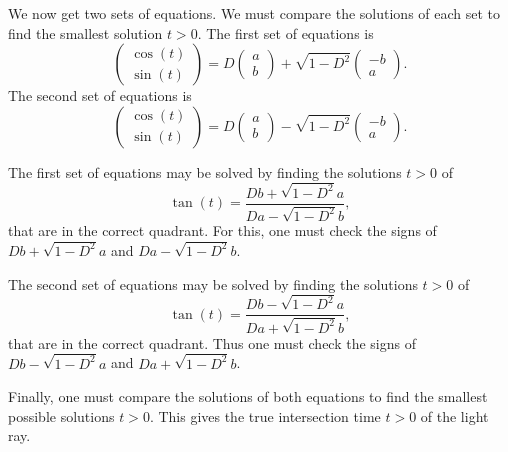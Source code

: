 \documentclass{article}
\begin{document}
We now get two sets of equations. We must compare the solutions of each set to find the smallest solution \(t>0\). The first set of equations is
\[\begin{pmatrix} \cos(t) \\ \sin(t)\end{pmatrix} = D \begin{pmatrix} a \\ b \end{pmatrix} + \sqrt{1-D^2}\begin{pmatrix} -b \\ a \end{pmatrix}.\]
The second set of equations is
\[\begin{pmatrix} \cos(t) \\ \sin(t)\end{pmatrix} = D \begin{pmatrix} a \\ b \end{pmatrix} - \sqrt{1-D^2}\begin{pmatrix} -b \\ a \end{pmatrix}.\]

The first set of equations may be solved by finding the solutions \(t>0\) of 
\[\tan(t) = \frac{D b + \sqrt{1-D^2} a}{D a - \sqrt{1-D^2} b}, \]
that are in the correct quadrant. For this, one must check the signs of \( D b + \sqrt{1-D^2} a\) and \(D a - \sqrt{1-D^2}b\).

The second set of equations may be solved by finding the solutions \(t>0\) of
\[\tan(t) = \frac{D b - \sqrt{1 - D^2} a}{D a + \sqrt{1-D^2} b},\]
that are in the correct quadrant. Thus one must check the signs of \(D b - \sqrt{1 - D^2} a\) and \(D a + \sqrt{1-D^2} b\).

Finally, one must compare the solutions of both equations to find the smallest possible solutions \(t>0\). This gives the true intersection time \(t>0\) of the light ray.
\end{document}
